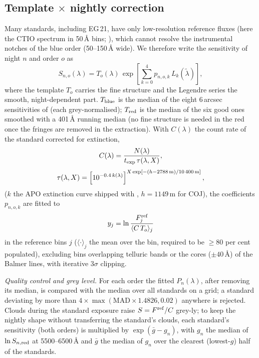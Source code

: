 \subsection{Template $\times$ nightly correction}
\label{sec:flux_model}
Many standards, including EG\,21, have only low-resolution reference fluxes (here the CTIO spectrum in 50\,\AA{} bins;
\citealt{Hamuy1992,Hamuy1994}), which cannot resolve the instrumental notches of the blue order (50--150\,\AA{} wide).
We therefore write the sensitivity of night $n$ and order $o$ as
\begin{equation}
S_{n,o}(\lambda)=T_o(\lambda)\,\exp\left[\sum_{k=0}^{4}p_{n,o,k}\,L_k(\tilde\lambda)\right],
\label{eq:sens}
\end{equation}
where the template $T_o$ carries the fine structure and the Legendre series the smooth, night-dependent part. $T_{\rm
blue}$ is the median of the eight 6\,arcsec sensitivities of \banzai{} (each grey-normalised); $T_{\rm red}$ is the
median of the six good ones smoothed with a 401\,\AA{} running median (no fine structure is needed in the red once
the fringes are removed in the extraction). With $C(\lambda)$ the count rate of the standard corrected for
extinction,
\begin{equation}
C(\lambda)=\frac{N(\lambda)}{t_{\rm exp}\,\tau(\lambda,X)},
\label{eq:rate}
\end{equation}
\begin{equation}
\tau(\lambda,X)=\left[10^{-0.4\,k(\lambda)}\right]^{X\exp[-(h-2788\,{\rm m})/10\,400\,{\rm m}]},
\label{eq:ext}
\end{equation}
($k$ the APO extinction curve shipped with \banzai, $h=1149$\,m for COJ), the coefficients $p_{n,o,k}$ are fitted
to
\begin{equation}
y_j=\ln\frac{F^{\rm ref}_j}{\langle C\,T_o\rangle_j}
\label{eq:sensfit}
\end{equation}
in the reference bins $j$ ($\langle\cdot\rangle_j$ the mean over the bin, required to be $\ge80$ per cent populated),
excluding bins overlapping telluric bands or the cores ($\pm40$\,\AA) of the Balmer lines, with iterative $3\sigma$
clipping.

\textit{Quality control and grey level.} For each order the fitted $P_n(\lambda)$, after removing its median, is compared
with the median over all standards on a grid; a standard deviating by more than $4\times\max(\mathrm{MAD}\times1.4826,
0.02)$ anywhere is rejected. Clouds during the standard exposure raise $S=F^{\rm ref}/C$ grey-ly; to keep the nightly
shape without transferring the standard's clouds, each standard's sensitivity (both orders) is multiplied by
$\exp(\bar g-g_n)$, with $g_n$ the median of $\ln S_{n,{\rm red}}$ at 5500--6500\,\AA{} and $\bar g$ the median of $g_n$
over the clearest (lowest-$g$) half of the standards.

